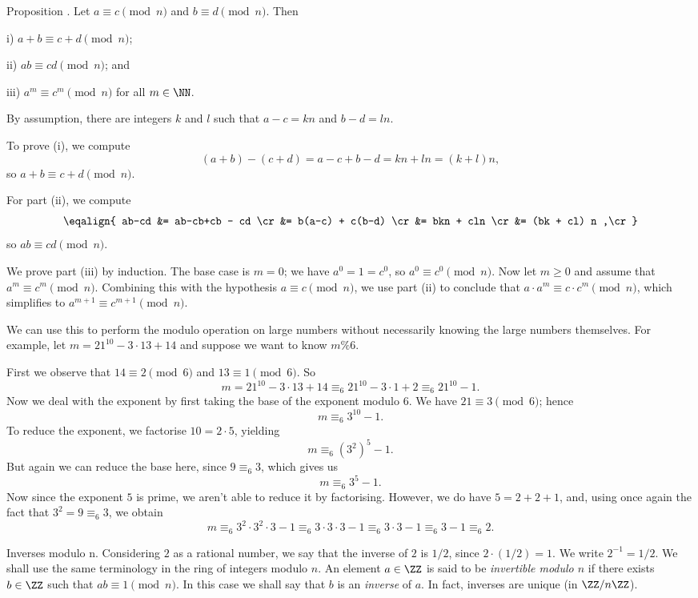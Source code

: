 \proclaim Proposition \advthm. Let $a\equiv c\pmod n$ and $b\equiv d\pmod n$. Then
\medskip
\item{i)} $a+b\equiv c+d \pmod n$;
\smallskip
\item{ii)} $ab\equiv cd\pmod n$; and
\smallskip
\item{iii)} $a^m \equiv c^m \pmod n$ for all $m\in \NN$.
\medskip

\proof By assumption, there are integers $k$ and $l$ such that $a-c = kn$ and $b-d = ln$.

To prove (i), we compute
$$(a+b)-(c+d) = a-c + b-d = kn+ln = (k+l)n,$$
so $a+b\equiv c+d\pmod n$.

For part (ii), we compute
$$\eqalign{
ab-cd &= ab-cb+cb - cd \cr
&= b(a-c) + c(b-d) \cr
&= bkn + cln \cr
&= (bk + cl) n ,\cr
}$$
so $ab\equiv cd \pmod n$.

We prove part (iii) by induction. The base case is $m=0$; we have $a^0 = 1 = c^0$,
so $a^0\equiv c^0\pmod n$. Now let $m\ge 0$ and assume that $a^m\equiv c^m\pmod n$.
Combining this with the hypothesis $a\equiv c\pmod n$, we use part (ii) to
conclude that $a\cdot a^m \equiv c\cdot c^m\pmod n$, which simplifies
to $a^{m+1}\equiv c^{m+1}\pmod n$.\slug

We can use this to perform the modulo operation on large numbers without necessarily
knowing the large numbers themselves. For example, let $m=21^{10} - 3\cdot 13 + 14$
and suppose we want to know $m\percent 6$.

First we observe that $14\equiv 2\pmod 6$
and $13\equiv 1\pmod 6$. So
$$ m = 21^{10} - 3\cdot 13 + 14 \equiv_6 21^{10} - 3\cdot 1 + 2 \equiv_6 21^{10} - 1.$$
Now we deal with the exponent by first taking the base of the exponent modulo $6$.
We have $21\equiv 3 \pmod 6$; hence
$$m \equiv_6 3^{10} -1.$$
To reduce the exponent,
we factorise $10=2\cdot 5$, yielding
$$m \equiv_6 (3^2)^5 - 1.$$
But again we can reduce the base here, since $9\equiv_6 3$, which gives us
$$m \equiv_6 3^5-1.$$
Now since the exponent $5$ is prime, we aren't able to reduce it by factorising. However,
we do have $5 = 2+2+1$, and, using once again the fact that $3^2 = 9\equiv_6 3$, we obtain
$$m \equiv_6 3^2\cdot 3^2 \cdot 3 - 1 \equiv_6 3\cdot 3\cdot 3 - 1 \equiv_6 3\cdot 3 - 1
\equiv_6 3- 1 \equiv_6 2.$$

\medskip\boldlabel Inverses modulo {\mathbold n}. Considering $2$ as a rational
number, we say that the inverse of $2$ is $1/2$, since $2\cdot (1/2) = 1$.
We write $2^{-1} = 1/2$. We shall use the same terminology in the ring of integers modulo $n$.
An element $a\in \ZZ$ is said to be {\it invertible modulo $n$} if there exists $b\in \ZZ$
such that $ab \equiv 1\pmod n$. In this case we shall say that $b$ is an {\it inverse} of $a$.
In fact, inverses are unique (in $\ZZ/n\ZZ$).

